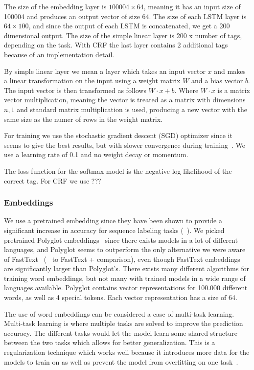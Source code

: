 The size of the embedding layer is $100004 \times 64$, meaning it has an input
size of 100004 and produces an output vector of size 64. The size of each LSTM
layer is $64 \times 100$, and since the output of each LSTM is concatenated, we
get a 200 dimensional output. The size of the simple linear layer is 200 x
number of tags, depending on the task. With CRF the last layer contains 2
additional tags because of an implementation detail.

By simple linear layer we mean a layer which takes an input vector $x$ and makes
a linear transformation on the input using a weight matrix $W$ and a bias vector
$b$. The input vector is then transformed as follows $W \cdot x + b$. Where $W
\cdot x$ is a matrix vector multiplication, meaning the vector is treated as a
matrix with dimensions $n,1$ and standard matrix multiplication is used,
producing a new vector with the same size as the numer of rows in the weight
matrix.

For training we use the stochastic gradient descent (SGD) optimizer since it
seems to give the best results, but with slower convergence during
training~\cite{Yang_liang_zhang}. We use a learning rate of 0.1 and no weight
decay or momentum.

The loss function for the softmax model is the negative log likelihood of the
correct tag. For CRF we use ???

\subsubsection{Embeddings}

We use a pretrained embedding since they have been shown to provide a
significant increase in accuracy for sequence labeling tasks (~\cite{Yang liang
zhang}). We picked pretrained Polyglot embeddings~\cite{Polyglot} since there
exists models in a lot of different languages, and Polyglot seems to outperform
the only alternative we were aware of FastText~\cite{FastText} (~\cite{} to
FastText + comparison), even though FastText embeddings are significantly larger
than Polyglot's. There exists many different algorithms for training word
embeddings, but not many with trained models in a wide range of languages
available. Polyglot contains vector representations for 100.000 different words,
as well as 4 special tokens. Each vector representation has a size of 64.

The use of word embeddings can be considered a case of multi-task learning.
Multi-task learning is where multiple tasks are solved to improve the prediction
accuracy. The different tasks would let the model learn some shared structure
between the two tasks which allows for better generalization. This is a
regularization technique which works well because it introduces more data for
the models to train on as well as prevent the model from overfitting on one
task~\cite{goodfellow2016deep}. 


